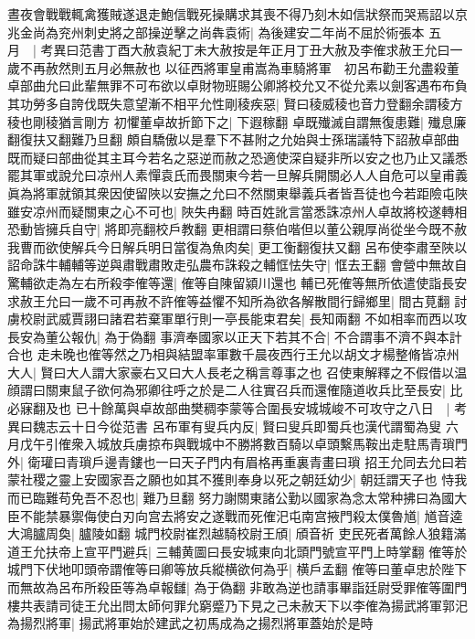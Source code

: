 晝夜會戰戰輒禽獲賊遂退走鮑信戰死操購求其喪不得乃刻木如信狀祭而哭焉詔以京兆金尚為兖州刺史將之部操逆擊之尚犇袁術|{
	為後建安二年尚不屈於術張本}
五月　|{
	考異曰范書丁酉大赦袁紀丁未大赦按是年正月丁丑大赦及李傕求赦王允曰一歲不再赦然則五月必無赦也}
以征西將軍皇甫嵩為車騎將軍　初呂布勸王允盡殺董卓部曲允曰此輩無罪不可布欲以卓財物班賜公卿將校允又不從允素以劍客遇布布負其功勞多自誇伐既失意望漸不相平允性剛稜疾惡|{
	賢曰稜威稜也音力登翻余謂稜方稜也剛稜猶言剛方}
初懼董卓故折節下之|{
	下遐稼翻}
卓既殱滅自謂無復患難|{
	殱息廉翻復扶又翻難乃旦翻}
頗自驕傲以是羣下不甚附之允始與士孫瑞議特下詔赦卓部曲既而疑曰部曲從其主耳今若名之惡逆而赦之恐適使深自疑非所以安之也乃止又議悉罷其軍或說允曰凉州人素憚袁氏而畏關東今若一旦解兵開關必人人自危可以皇甫義眞為將軍就領其衆因使留陜以安撫之允曰不然關東舉義兵者皆吾徒也今若距險屯陜雖安凉州而疑關東之心不可也|{
	陜失冉翻}
時百姓訛言當悉誅凉州人卓故將校遂轉相恐動皆擁兵自守|{
	將即亮翻校戶教翻}
更相謂曰蔡伯喈但以董公親厚尚從坐今既不赦我曹而欲使解兵今日解兵明日當復為魚肉矣|{
	更工衡翻復扶又翻}
呂布使李肅至陜以詔命誅牛輔輔等逆與肅戰肅敗走弘農布誅殺之輔恇怯失守|{
	恇去王翻}
會營中無故自驚輔欲走為左右所殺李傕等還|{
	傕等自陳留潁川還也}
輔已死傕等無所依遣使詣長安求赦王允曰一歲不可再赦不許傕等益懼不知所為欲各解散間行歸鄉里|{
	間古莧翻}
討虜校尉武威賈詡曰諸君若棄軍單行則一亭長能束君矣|{
	長知兩翻}
不如相率而西以攻長安為董公報仇|{
	為于偽翻}
事濟奉國家以正天下若其不合|{
	不合謂事不濟不與本計合也}
走未晚也傕等然之乃相與結盟率軍數千晨夜西行王允以胡文才楊整脩皆凉州大人|{
	賢曰大人謂大家豪右又曰大人長老之稱言尊事之也}
召使東解釋之不假借以温顔謂曰關東鼠子欲何為邪卿往呼之於是二人往實召兵而還傕隨道收兵比至長安|{
	比必寐翻及也}
已十餘萬與卓故部曲樊稠李蒙等合圍長安城城峻不可攻守之八日　|{
	考異曰魏志云十日今從范書}
呂布軍有叟兵内反|{
	賢曰叟兵即蜀兵也漢代謂蜀為叟}
六月戊午引傕衆入城放兵虜掠布與戰城中不勝將數百騎以卓頭繫馬鞍出走駐馬青瑣門外|{
	衛瓘曰青瑣戶邊青鏤也一曰天子門内有眉格再重裏青畫曰瑣}
招王允同去允曰若蒙社稷之靈上安國家吾之願也如其不獲則奉身以死之朝廷幼少|{
	朝廷謂天子也}
恃我而已臨難苟免吾不忍也|{
	難乃旦翻}
努力謝關東諸公勤以國家為念太常种拂曰為國大臣不能禁暴禦侮使白刃向宫去將安之遂戰而死傕汜屯南宫掖門殺太僕魯馗|{
	馗音逵}
大鴻臚周奐|{
	臚陵如翻}
城門校尉崔烈越騎校尉王頎|{
	頎音祈}
吏民死者萬餘人狼籍滿道王允扶帝上宣平門避兵|{
	三輔黄圖曰長安城東向北頭門號宣平門上時掌翻}
傕等於城門下伏地叩頭帝謂傕等曰卿等放兵縱横欲何為乎|{
	横戶孟翻}
傕等曰董卓忠於陛下而無故為呂布所殺臣等為卓報讎|{
	為于偽翻}
非敢為逆也請事畢詣廷尉受罪傕等圍門樓共表請司徒王允出問太師何罪允窮蹙乃下見之己未赦天下以李傕為揚武將軍郭汜為揚烈將軍|{
	揚武將軍始於建武之初馬成為之揚烈將軍蓋始於是時}
